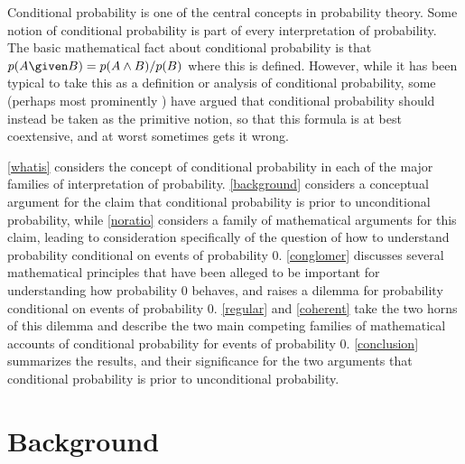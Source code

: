 
%


Conditional probability is one of the central concepts in probability theory. Some notion of conditional probability is part of every interpretation of probability. The basic mathematical fact about conditional probability is that $p(A \given B)=p(A\land B)/p(B)$ where this is defined. However, while it has been typical to take this as a definition or analysis of conditional probability, some (perhaps most prominently \citealp{wcpcnb}) have argued that conditional probability should instead be taken as the primitive notion, so that this formula is at best coextensive, and at worst sometimes gets it wrong.

\autoref{whatis} considers the concept of conditional probability in each of the major families of interpretation of probability. \autoref{background} considers a conceptual argument for the claim that conditional probability is prior to unconditional probability, while \autoref{noratio} considers a family of mathematical arguments for this claim, leading to consideration specifically of the question of how to understand probability conditional on events of probability $0$. \autoref{conglomer} discusses several mathematical principles that have been alleged to be important for understanding how probability $0$ behaves, and raises a dilemma for probability conditional on events of probability $0$. \autoref{regular} and \autoref{coherent} take the two horns of this dilemma and describe the two main competing families of mathematical accounts of conditional probability for events of probability $0$. \autoref{conclusion} summarizes the results, and their significance for the two arguments that conditional probability is prior to unconditional probability.


\section{Background}

